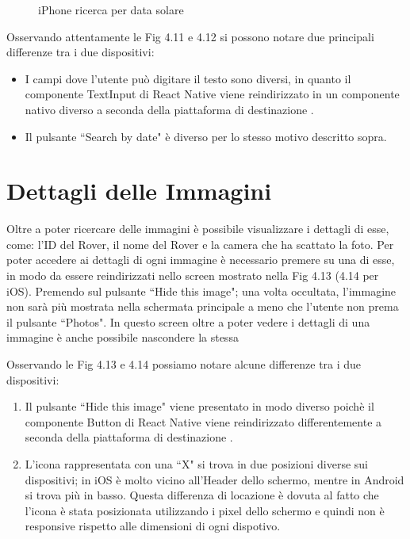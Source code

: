 \begin{figure}[h]
\begin{minipage}[h]{0.47\textwidth}
        \caption{\label{SearchbyDateIphone}iPhone ricerca per data solare}
    \end{minipage}
\end{figure}

Osservando attentamente le Fig 4.11 e 4.12 si possono notare due principali differenze tra i due dispositivi:
\begin{itemize}
    \item I campi dove l'utente pu\`o digitare il testo sono diversi, in quanto il componente TextInput di React Native viene reindirizzato in un componente nativo diverso a seconda della piattaforma di destinazione \cite{ReactNativeComponent}.
    \item Il pulsante ``Search by date" \`e diverso per lo stesso motivo descritto sopra.
\end{itemize}

\section*{Dettagli delle Immagini}
Oltre a poter ricercare delle immagini \`e possibile visualizzare i dettagli di esse, come: l'ID del Rover, il nome del Rover e la camera che ha scattato la foto.
Per poter accedere ai dettagli di ogni immagine \`e necessario premere su una di esse, in modo da essere reindirizzati nello screen mostrato nella Fig 4.13 (4.14 per iOS).
Premendo sul pulsante ``Hide this image"; una volta occultata, l'immagine non sar\`a pi\`u mostrata nella schermata principale a meno che l'utente non prema il pulsante ``Photos". In questo screen oltre a poter vedere i dettagli di una immagine \`e anche possibile nascondere la stessa

Osservando le Fig 4.13 e 4.14 possiamo notare alcune differenze tra i due dispositivi:
\begin{enumerate}
    \item Il pulsante ``Hide this image" viene presentato in modo diverso poich\`e il componente Button di React Native viene reindirizzato differentemente a seconda della piattaforma di destinazione \cite{ReactNativeComponent}.
    \item L'icona rappresentata con una ``X" si trova in due posizioni diverse sui dispositivi; in iOS \`e molto vicino all'Header dello schermo, mentre in Android si trova pi\`u in basso. Questa differenza di locazione
    \`e dovuta al fatto che l'icona \`e stata posizionata utilizzando i pixel dello schermo e quindi non \`e responsive rispetto alle dimensioni di ogni dispotivo.
\end{enumerate}

